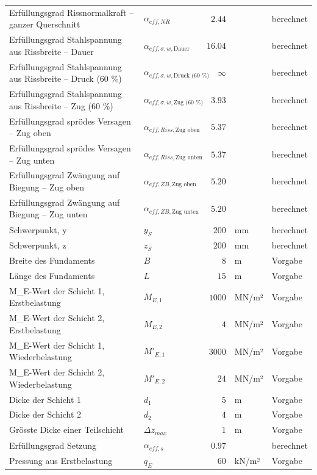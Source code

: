 \documentclass[11pt,a4paper]{article}
\begin{document}
\begin{xltabular}{\linewidth}{>{\raggedright\arraybackslash}Xlrll}
Erfüllungsgrad Rissnormalkraft – ganzer Querschnitt & $\alpha_{eff,NR}$ & $2.44$ &  & berechnet \\
Erfüllungsgrad Stahlspannung aus Rissbreite – Dauer & $\alpha_{eff,\sigma,w,\text{Dauer}}$ & $16.04$ &  & berechnet \\
Erfüllungsgrad Stahlspannung aus Rissbreite – Druck (60 \%) & $\alpha_{eff,\sigma,w,\text{Druck (60 \%)}}$ & $\infty$ &  & berechnet \\
Erfüllungsgrad Stahlspannung aus Rissbreite – Zug (60 \%) & $\alpha_{eff,\sigma,w,\text{Zug (60 \%)}}$ & $3.93$ &  & berechnet \\
Erfüllungsgrad sprödes Versagen – Zug oben & $\alpha_{eff,Riss,\text{Zug oben}}$ & $5.37$ &  & berechnet \\
Erfüllungsgrad sprödes Versagen – Zug unten & $\alpha_{eff,Riss,\text{Zug unten}}$ & $5.37$ &  & berechnet \\
Erfüllungsgrad Zwängung auf Biegung – Zug oben & $\alpha_{eff,ZB,\text{Zug oben}}$ & $5.20$ &  & berechnet \\
Erfüllungsgrad Zwängung auf Biegung – Zug unten & $\alpha_{eff,ZB,\text{Zug unten}}$ & $5.20$ &  & berechnet \\
Schwerpunkt, y & $y_S$ & $200$ & mm & berechnet \\
Schwerpunkt, z & $z_S$ & $200$ & mm & berechnet \\
Breite des Fundaments & $B$ & $8$ & m & Vorgabe \\
Länge des Fundaments & $L$ & $15$ & m & Vorgabe \\
M\_E-Wert der Schicht 1, Erstbelastung & $M_{E,1}$ & $1000$ & MN/m² & Vorgabe \\
M\_E-Wert der Schicht 2, Erstbelastung & $M_{E,2}$ & $4$ & MN/m² & Vorgabe \\
M\_E-Wert der Schicht 1, Wiederbelastung & $M'_{E,1}$ & $3000$ & MN/m² & Vorgabe \\
M\_E-Wert der Schicht 2, Wiederbelastung & $M'_{E,2}$ & $24$ & MN/m² & Vorgabe \\
Dicke der Schicht 1 & $d_{1}$ & $5$ & m & Vorgabe \\
Dicke der Schicht 2 & $d_{2}$ & $4$ & m & Vorgabe \\
Grösste Dicke einer Teilschicht & $\Delta z_{max}$ & $1$ & m & Vorgabe \\
Erfüllungsgrad Setzung & $\alpha_{eff,s}$ & $0.97$ &  & berechnet \\
Pressung aus Erstbelastung & $q_E$ & $60$ & kN/m² & Vorgabe \\

\end{xltabular}
\end{document}
